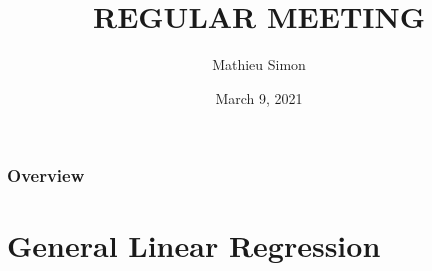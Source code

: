 \documentclass[xcolor=table]{beamer}
\title[Regular Meeting]{
\uppercase{Regular Meeting}
}
\author{Mathieu Simon}
\institute[University of Bern]
{
MSc - Biomedical Engineering \\
University of Bern, Faculty of Medicine \\
\medskip
}
\date{March 9, 2021}
\begin{document}
\begin{frame}
\titlepage
\end{frame}


\begin{frame}
	\frametitle{Overview}
	\tableofcontents
\end{frame}


\section{General Linear Regression}
\end{document}
